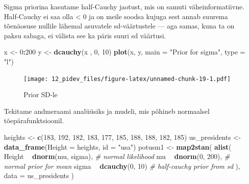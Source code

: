 \documentclass[]{book}
\newenvironment{Shaded}{\begin{snugshade}}{\end{snugshade}}
\newcommand{\CommentTok}[1]{\textcolor[rgb]{0.56,0.35,0.01}{\textit{#1}}}
\newcommand{\DataTypeTok}[1]{\textcolor[rgb]{0.13,0.29,0.53}{#1}}
\newcommand{\DecValTok}[1]{\textcolor[rgb]{0.00,0.00,0.81}{#1}}
\newcommand{\KeywordTok}[1]{\textcolor[rgb]{0.13,0.29,0.53}{\textbf{#1}}}
\newcommand{\NormalTok}[1]{#1}
\newcommand{\OperatorTok}[1]{\textcolor[rgb]{0.81,0.36,0.00}{\textbf{#1}}}
\newcommand{\StringTok}[1]{\textcolor[rgb]{0.31,0.60,0.02}{#1}}
\begin{document}
Sigma priorina kasutame half-Cauchy jaotust, mis on samuti väheinformatiivne.
Half-Cauchy ei saa olla \textless{} 0 ja on meile soodsa kujuga sest annab suurema tõenäosuse nullile lähemal asuvatele sd-väärtustele --- aga samas, kuna ta on paksu sabaga, ei välista see ka päris suuri sd väärtusi.

\begin{Shaded}
\begin{Highlighting}[]
\NormalTok{x <-}\StringTok{ }\DecValTok{0}\OperatorTok{:}\DecValTok{200}
\NormalTok{y <-}\StringTok{ }\KeywordTok{dcauchy}\NormalTok{(x , }\DecValTok{0}\NormalTok{, }\DecValTok{10}\NormalTok{)}
\KeywordTok{plot}\NormalTok{(x, y, }\DataTypeTok{main =} \StringTok{"Prior for sigma"}\NormalTok{, }\DataTypeTok{type =} \StringTok{"l"}\NormalTok{)}
\end{Highlighting}
\end{Shaded}

\begin{figure}
\centering
\texttt{[image: 12\_pidev\_files/figure-latex/unnamed-chunk-19-1.pdf]}
\caption{\label{fig:unnamed-chunk-19}Prior SD-le}
\end{figure}

Tekitame andmeraami analüüsiks ja mudeli, mis põhineb normaalsel tõepärafunktsioonil.

\begin{Shaded}
\begin{Highlighting}[]
\NormalTok{heights <-}\StringTok{ }\KeywordTok{c}\NormalTok{(}\DecValTok{183}\NormalTok{, }\DecValTok{192}\NormalTok{, }\DecValTok{182}\NormalTok{, }\DecValTok{183}\NormalTok{, }\DecValTok{177}\NormalTok{, }\DecValTok{185}\NormalTok{, }\DecValTok{188}\NormalTok{, }\DecValTok{188}\NormalTok{, }\DecValTok{182}\NormalTok{, }\DecValTok{185}\NormalTok{)}
\NormalTok{us_presidents <-}\StringTok{ }\KeywordTok{data_frame}\NormalTok{(}\DataTypeTok{Height =}\NormalTok{ heights, }\DataTypeTok{id =} \StringTok{"usa"}\NormalTok{)}
\NormalTok{potusm1 <-}\StringTok{ }\KeywordTok{map2stan}\NormalTok{(}
  \KeywordTok{alist}\NormalTok{(}
\NormalTok{    Height }\OperatorTok{~}\StringTok{ }\KeywordTok{dnorm}\NormalTok{(mu, sigma), }\CommentTok{# normal likelihood}
\NormalTok{    mu }\OperatorTok{~}\StringTok{ }\KeywordTok{dnorm}\NormalTok{(}\DecValTok{0}\NormalTok{, }\DecValTok{200}\NormalTok{), }\CommentTok{# normal prior for mean}
\NormalTok{    sigma }\OperatorTok{~}\StringTok{ }\KeywordTok{dcauchy}\NormalTok{(}\DecValTok{0}\NormalTok{, }\DecValTok{10}\NormalTok{) }\CommentTok{# half-cauchy prior from sd }
\NormalTok{  ), }\DataTypeTok{data =}\NormalTok{ us_presidents}
\NormalTok{)}
\end{Highlighting}
\end{Shaded}
\end{document}

